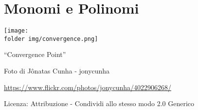 \part{Monomi e Polinomi}

\texttt{[image: \\folder img/convergence.png]}
  \begin{center}
    {\large ``Convergence Point''}\par
    Foto di Jônatas Cunha - jonycunha\par
    \url{https://www.flickr.com/photos/jonycunha/4022906268/}\par
    Licenza: Attribuzione - Condividi allo stesso modo 2.0 Generico\par
  \end{center}
\clearpage
\cleardoublepage
